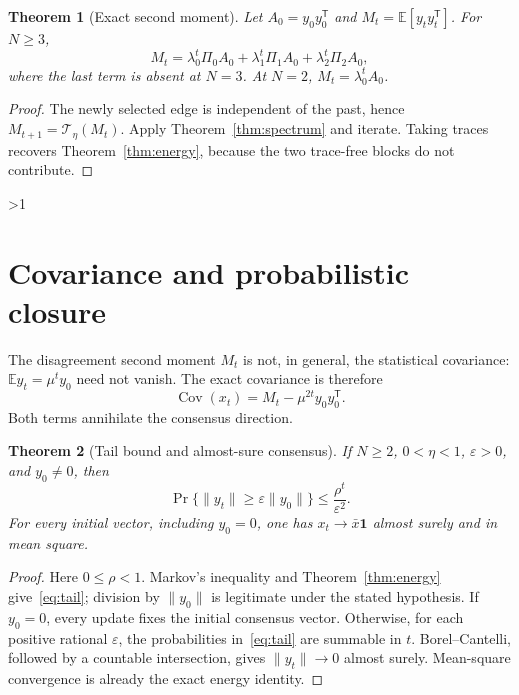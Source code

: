 \documentclass[10pt]{article}
\providecommand{\CRevisionRound}{2}
\newtheorem{theorem}{Theorem}
\newcommand{\EE}{\mathbb E}
\newcommand{\one}{\mathbf 1}
\newcommand{\cT}{\mathcal T}
\begin{document}
\begin{theorem}[Exact second moment]\label{thm:second}
Let $A_0=y_0y_0^{\mathsf T}$ and
$M_t=\EE[y_ty_t^{\mathsf T}]$.  For $N\geq3$,
\begin{equation}\label{eq:Mt}
 M_t=\lambda_0^t\Pi_0A_0+\lambda_1^t\Pi_1A_0
       +\lambda_2^t\Pi_2A_0,
\end{equation}
where the last term is absent at $N=3$.  At $N=2$,
$M_t=\lambda_0^tA_0$.
\end{theorem}

\begin{proof}
The newly selected edge is independent of the past, hence
$M_{t+1}=\cT_\eta(M_t)$.  Apply Theorem~\ref{thm:spectrum} and iterate.
Taking traces recovers Theorem~\ref{thm:energy}, because the two trace-free
blocks do not contribute.
\end{proof}
\fi

\ifnum\CRevisionRound>1
\section{Covariance and probabilistic closure}
The disagreement second moment $M_t$ is not, in general, the statistical
covariance: $\EE y_t=\mu^ty_0$ need not vanish.  The exact covariance is
therefore
\begin{equation}\label{eq:covariance}
 \operatorname{Cov}(x_t)
 =M_t-\mu^{2t}y_0y_0^{\mathsf T}.
\end{equation}
Both terms annihilate the consensus direction.

\begin{theorem}[Tail bound and almost-sure consensus]\label{thm:as}
If $N\geq2$, $0<\eta<1$, $\varepsilon>0$, and $y_0\ne0$, then
\begin{equation}\label{eq:tail}
 \Pr\{\|y_t\|\geq\varepsilon\|y_0\|\}
 \leq\frac{\rho^t}{\varepsilon^2}.
\end{equation}
For every initial vector, including $y_0=0$, one has
$x_t\to\bar x\one$ almost surely and in mean square.
\end{theorem}

\begin{proof}
Here $0\leq\rho<1$.  Markov's inequality and
Theorem~\ref{thm:energy} give~\eqref{eq:tail}; division by $\|y_0\|$ is
legitimate under the stated hypothesis.  If $y_0=0$, every update fixes the
initial consensus vector.  Otherwise, for each positive rational
$\varepsilon$, the probabilities in~\eqref{eq:tail} are summable in $t$.
Borel--Cantelli, followed by a countable intersection, gives
$\|y_t\|\to0$ almost surely.  Mean-square convergence is already the exact
energy identity.
\end{proof}
\end{document}
